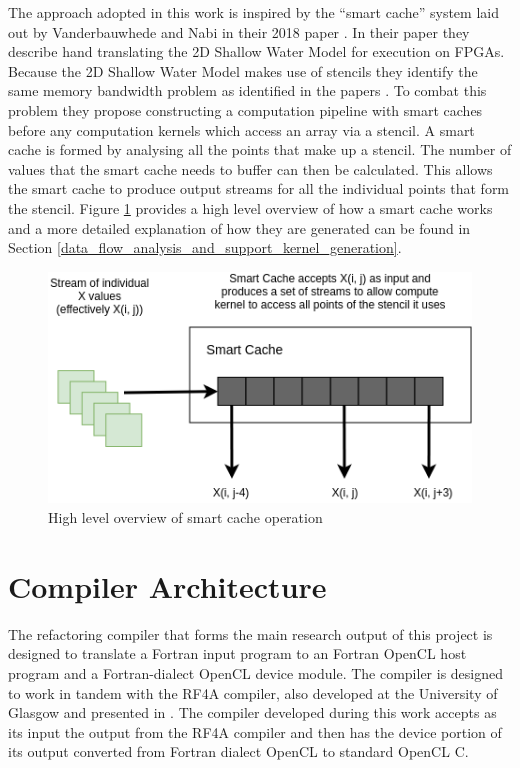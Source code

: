 \documentclass{mpaper}
\begin{document}
The approach adopted in this work is inspired by the ``smart cache'' system laid out by Vanderbauwhede and Nabi in their 2018 paper \cite{VanderbauwhedeNabi2018}.
In their paper they describe hand translating the 2D Shallow Water Model \cite{Hall2009} for execution on FPGAs. 
Because the 2D Shallow Water Model makes use of stencils they identify the same memory bandwidth problem as identified in the papers \cite{Fu2011,Waidyasooriya2017}.
To combat this problem they propose constructing a computation pipeline with smart caches before any computation kernels which access an array via a stencil.
A smart cache is formed by analysing all the points that make up a stencil. 
The number of values that the smart cache needs to buffer can then be calculated.
This allows the smart cache to produce output streams for all the individual points that form the stencil.
Figure \ref{fig:smartcache} provides a high level overview of how a smart cache works and a more detailed explanation of how they are generated can be found in Section \ref{data_flow_analysis_and_support_kernel_generation}.

\begin{figure}
    \centering
    \includegraphics[scale=0.5]{images/Smart_Cache_Buffer.png}
    \caption{High level overview of smart cache operation}
    \label{fig:smartcache}
\end{figure}

\section{Compiler Architecture}

The refactoring compiler that forms the main research output of this project is designed to translate a Fortran input program to an Fortran OpenCL host program and a Fortran-dialect OpenCL device module. The compiler is designed to work in tandem with the RF4A compiler, also developed at the University of Glasgow and presented in \cite{VanderbauwhedeDavidson2018, VanderbauwhedeNabi2018}. The compiler developed during this work accepts as its input the output from the RF4A compiler and then has the device portion of its output converted from Fortran dialect OpenCL to standard OpenCL C. 
\end{document}

